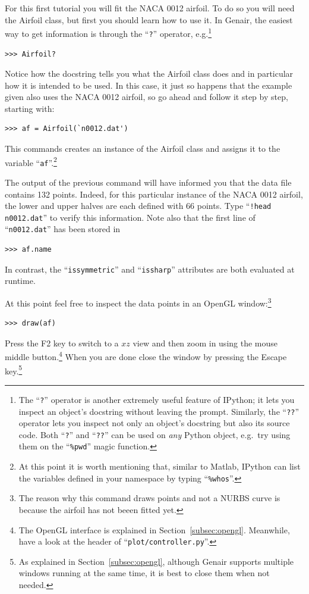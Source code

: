 \documentclass[]{article}
\begin{document}
For this first tutorial you will fit the NACA 0012 airfoil.  To do so 
you will need the Airfoil class, but first you should learn how to use 
it.  In Genair, the easiest way to get information is through the 
``\texttt{?}'' operator, e.g.\footnote{The ``\texttt{?}'' operator is 
another extremely useful feature of IPython; it lets you inspect an 
object's docstring without leaving the prompt.  Similarly, the 
``\texttt{??}'' operator lets you inspect not only an object's docstring 
but also its source code.  Both ``\texttt{?}'' and ``\texttt{??}'' can 
be used on \emph{any} Python object, e.g.\ try using them on the 
``\texttt{\%pwd}'' magic function.}
\begin{verbatim}
>>> Airfoil?
\end{verbatim}
Notice how the docstring tells you what the Airfoil class does and in 
particular how it is intended to be used.  In this case, it just so 
happens that the example given also uses the NACA 0012 airfoil, so go 
ahead and follow it step by step, starting with:
\begin{verbatim}
>>> af = Airfoil(`n0012.dat')
\end{verbatim}
This commands creates an instance of the Airfoil class and assigns it to 
the variable ``\texttt{af}''.\footnote{At this point it is worth 
mentioning that, similar to Matlab, IPython can list the variables 
defined in your namespace by typing ``\texttt{\%whos}''.}

The output of the previous command will have informed you that the data 
file contains 132 points.  Indeed, for this particular instance of the 
NACA 0012 airfoil, the lower and upper halves are each defined with 66 
points.  Type ``\texttt{!head n0012.dat}'' to verify this information.  
Note also that the first line of ``\texttt{n0012.dat}'' has been stored 
in
\begin{verbatim}
>>> af.name
\end{verbatim}
In contrast, the ``\texttt{issymmetric}'' and ``\texttt{issharp}'' 
attributes are both evaluated at runtime.

At this point feel free to inspect the data points in an OpenGL 
window:\footnote{The reason why this command draws points and not a 
NURBS curve is because the airfoil has not beeen fitted yet.}
\begin{verbatim}
>>> draw(af)
\end{verbatim}
Press the F2 key to switch to a $xz$ view and then zoom in using the 
mouse middle button.\footnote{The OpenGL interface is explained in 
Section~\ref{subsec:opengl}.  Meanwhile, have a look at the header of 
``\texttt{plot/controller.py}''.}  When you are done close the window by 
pressing the Escape key.\footnote{As explained in 
Section~\ref{subsec:opengl}, although Genair supports multiple windows 
running at the same time, it is best to close them when not needed.}
\end{document}

